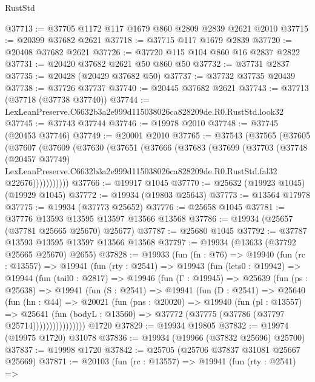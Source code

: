 \begin{lexlean}{RustStd}
\begin{coremodule}
@37713 := @37705 @1172 @117 @1679 @860 @2809 @2839 @2621 @2010
@37715 := @20399 @37682 @2621
@37718 := @37715 @117 @1679 @2839
@37720 := @20408 @37682 @2621
@37726 := @37720 @115 @104 @860 @16 @2837 @2822
@37731 := @20420 @37682 @2621 @50 @860 @50
@37732 := @37731 @2837
@37735 := @20428 (@20429 @37682 @50)
@37737 := @37732 @37735 @20439
@37738 := @37726 @37737
@37740 := @20445 @37682 @2621
@37743 := @37713 (@37718 (@37738 @37740))
@37744 := LexLeanPreserve.C6632b3a2e999d115038026ca828209de.R0.RustStd.look32
@37745 := @37743 @37744
@37746 := @19978 @2010
@37748 := @37745 (@20453 @37746)
@37749 := @20001 @2010
@37765 := @37543
    (@37565
      (@37605
        (@37607
          (@37609
            (@37630
              (@37651
                (@37666
                  (@37683
                    (@37699
                      (@37703
                        (@37748
                          (@20457 @37749)
                          LexLeanPreserve.C6632b3a2e999d115038026ca828209de.R0.RustStd.fal32
                          @22676)))))))))))
@37766 := @19917 @1045
@37770 := @25632 (@19923 @1045) (@19929 @1045)
@37772 := @19934 (@19803 @25643)
@37773 := @13564 @17978
@37775 := @19934 (@37773 @25652)
@37776 := @25658 @1045
@37781 := @37776 @13593 @13595 @13597 @13566 @13568
@37786 := @19934 (@25657 (@37781 @25665 @25670) @25677)
@37787 := @25680 @1045
@37792 := @37787 @13593 @13595 @13597 @13566 @13568
@37797 := @19934 (@13633 (@37792 @25665 @25670) @2655)
@37828 := @19933
    (fun (fn : @76) =>
    @19940
      (fun (rc : @13557) =>
      @19941
        (fun (rty : @2541) =>
        @19943
          (fun (lets0 : @19942) =>
          @19944
            (fun (tail0 : @2817) =>
            @19946
              (fun (Γ : @19945) =>
              @25639
                (fun (ps : @25638) =>
                @19941
                  (fun (S : @2541) =>
                  @19941
                    (fun (D : @2541) =>
                    @25640
                      (fun (hn : @44) =>
                      @20021
                        (fun (pns : @20020) =>
                        @19940
                          (fun (pl : @13557) =>
                          @25641
                            (fun (bodyL : @13560) =>
                            @37772 (@37775 (@37786 (@37797 @25714))))))))))))))))
    @1720
@37829 := @19934 @19805
@37832 := @19974 (@19975 @1720) @31078
@37836 := @19934 (@19966 (@37832 @25696) @25700)
@37837 := @19998 @1720
@37842 := @25705 (@25706 @37837 @31081 @25667 @25669)
@37871 := @20103
    (fun (rc : @13557) =>
    @19941
      (fun (rty : @2541) =>

\end{coremodule}
\end{lexlean}
